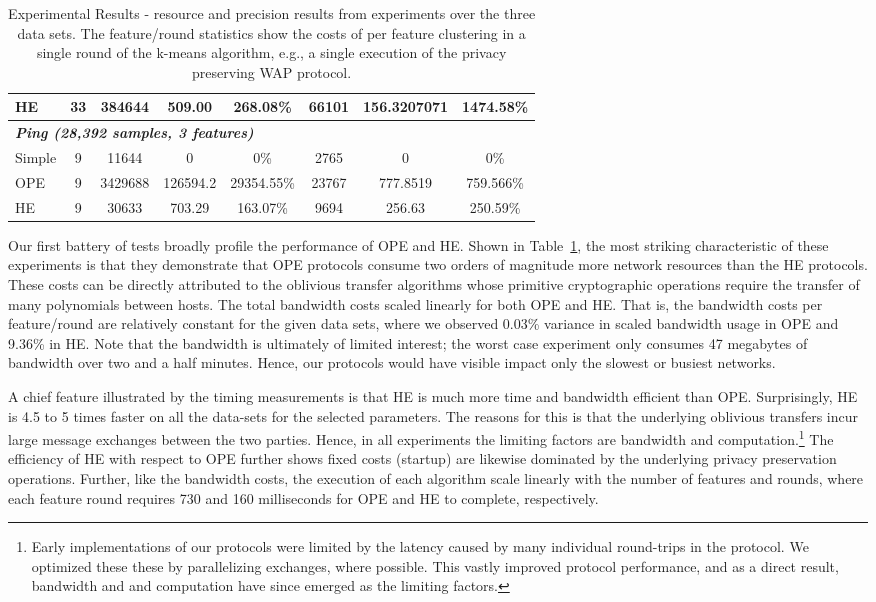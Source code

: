 \begin{table}
\begin{center}
\begin{tabular}{|l|c|c|c|c|c|c|c|}
\hline
HE & 33 & 384644 & 509.00 & 268.08\% & 66101 & 156.3207071 & 1474.58\% \\
\hline
\hline
\multicolumn{8}{|l|}{\bf\it Ping ({\it 28,392 samples, 3 features})} \\
\hline
Simple & 9 & 11644 & 0 & 0\% & 2765 & 0 & 0\% \\
\hline
OPE & 9 & 3429688 & 126594.2 & 29354.55\% & 23767 & 777.8519 &   759.566\% \\
\hline
HE & 9 & 30633 & 703.29 & 163.07\% & 9694 & 256.63 & 250.59\% \\
\hline
\end{tabular}
\end{center}
\caption{Experimental Results - resource and precision results from
experiments over the three data sets.  The feature/round statistics
show the costs of per feature clustering in a single round of the
k-means algorithm, e.g., a single execution of the privacy preserving
WAP protocol.}
\label{tbl:results}
\end{table}

Our first battery of tests broadly profile the performance of OPE and
HE.  Shown in Table~\ref{tbl:results}, the most striking
characteristic of these experiments is that they demonstrate that OPE
protocols consume two orders of magnitude more network resources than
the HE protocols.  These costs can be directly attributed to the
oblivious transfer algorithms whose primitive cryptographic operations
require the transfer of many polynomials between hosts.  The total
bandwidth costs scaled linearly for both OPE and HE.  That is, the
bandwidth costs per feature/round are relatively constant for the
given data sets, where we observed 0.03\% variance in scaled bandwidth
usage in OPE and 9.36\% in HE.  Note that the bandwidth is ultimately
of limited interest; the worst case experiment only consumes 47
megabytes of bandwidth over two and a half minutes.  Hence, our
protocols would have visible impact only the slowest or busiest
networks.

A chief feature illustrated by the timing measurements is that HE is
much more time and bandwidth efficient than OPE.  Surprisingly, HE is
4.5 to 5 times faster on all the data-sets for the selected
parameters.  The reasons for this is that the underlying oblivious
transfers incur large message exchanges between the two parties.
Hence, in all experiments the limiting factors are bandwidth and
computation.\footnote{Early implementations of our protocols were
limited by the latency caused by many individual round-trips in the
protocol.  We optimized these these by parallelizing exchanges, where
possible.  This vastly improved protocol performance, and as a direct
result, bandwidth and and computation have since emerged as the
limiting factors.}  The efficiency of HE with respect to OPE further
shows fixed costs (startup) are likewise dominated by the underlying
privacy preservation operations.  Further, like the bandwidth costs,
the execution of each algorithm scale linearly with the number of
features and rounds, where each feature round requires 730 and 160
milliseconds for OPE and HE to complete, respectively.

